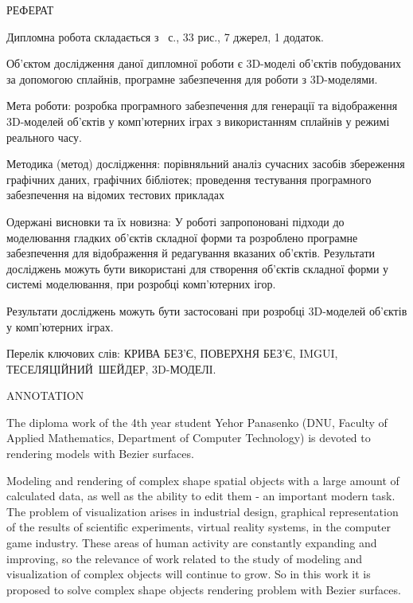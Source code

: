 \let\mypdfximage\pdfximage\def\pdfximage{\immediate\mypdfximage}\documentclass[14pt,a4paper]{extarticle}
\title{}
\author{}
\date{}
\theoremstyle{definition}
\renewcommand{\[}{\begin{singlespace}\begin{equation*}}
\renewcommand{\]}{\end{equation*}\end{singlespace}}
\renewcommand{\+}{\discretionary{\mbox{\scriptsize$\hookleftarrow$}}{}{}}
\begin{document}
\captionsetup[figure]{format=plain,labelsep=endash,labelfont=normalfont,textfont=normalfont}
\sloppy %
\allowdisplaybreaks %



\thispagestyle{empty}
\begin{center}
РЕФЕРАТ
\end{center}


Дипломна робота складається з~\pageref{lastpage} с., 33 рис., 7 джерел, 1 додаток.

Об'єктом дослідження даної дипломної роботи є 3D-моделі об'єктів побудованих за допомогою сплайнів, програмне забезпечення для роботи з 3D-моделями.

Мета роботи: розробка програмного забезпечення для генерації та відображення 3D-моделей об'єктів у комп'ютерних іграх з використанням сплайнів у режимі реального часу.

Методика (метод) дослідження: порівняльний аналіз  сучасних засобів збереження графічних даних, графічних бібліотек; проведення тестування програмного забезпечення на відомих тестових прикладах

Одержані висновки та їх новизна: У роботі запропоновані підходи до моделювання гладких об'єктів складної форми та розроблено програмне забезпечення для відображення й редагування вказаних об'єктів. Результати досліджень можуть бути використані для створення об'єктів складної форми у системі моделювання, при розробці комп'ютерних ігор.

Результати досліджень можуть бути застосовані при розробці 3D-моделей об'єктів у комп'ютерних іграх.

Перелік ключових слів: КРИВА БЕЗ'Є, ПОВЕРХНЯ БЕЗ'Є, IMGUI, ТЕСЕЛЯЦІЙНИЙ ШЕЙДЕР, 3D-МОДЕЛІ.

\newpage

\begin{center}
ANNOTATION
\end{center}

The diploma work of the 4th year student Yehor Panasenko (DNU, Faculty of Applied Mathematics, Department of Computer Technology) is devoted to rendering models with Bezier surfaces.

Modeling and rendering of complex shape spatial objects with a large amount of calculated data, as well as the ability to edit them - an important modern task. The problem of visualization arises in industrial design, graphical representation of the results of scientific experiments, virtual reality systems, in the computer game industry. These areas of human activity are constantly expanding and improving, so the relevance of work related to the study of modeling and visualization of complex objects will continue to grow. So in this work it is proposed to solve complex shape objects rendering problem with Bezier surfaces.
\end{document}
